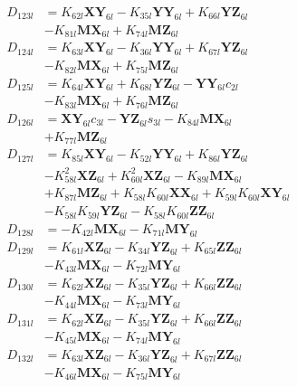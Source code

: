 \begin{align}
D_{123l} &= K_{62l}\mathbf{XY}_{6l} - K_{35l}\mathbf{YY}_{6l} + K_{66l}\mathbf{YZ}_{6l}  \nonumber \\
&- K_{81l}\mathbf{MX}_{6l} + K_{74l}\mathbf{MZ}_{6l} \nonumber \\
D_{124l} &= K_{63l}\mathbf{XY}_{6l} - K_{36l}\mathbf{YY}_{6l} + K_{67l}\mathbf{YZ}_{6l}  \nonumber \\
&- K_{82l}\mathbf{MX}_{6l} + K_{75l}\mathbf{MZ}_{6l} \nonumber \\
D_{125l} &= K_{64l}\mathbf{XY}_{6l} + K_{68l}\mathbf{YZ}_{6l} - \mathbf{YY}_{6l}c_{2l}  \nonumber \\
&- K_{83l}\mathbf{MX}_{6l} + K_{76l}\mathbf{MZ}_{6l} \nonumber \\
D_{126l} &= \mathbf{XY}_{6l}c_{3l} - \mathbf{YZ}_{6l}s_{3l} - K_{84l}\mathbf{MX}_{6l}  \nonumber \\
&+ K_{77l}\mathbf{MZ}_{6l} \nonumber \\
D_{127l} &= K_{85l}\mathbf{XY}_{6l} - K_{52l}\mathbf{YY}_{6l} + K_{86l}\mathbf{YZ}_{6l}  \nonumber \\
&- K_{58l}^2\mathbf{XZ}_{6l} + K_{60l}^2\mathbf{XZ}_{6l} - K_{89l}\mathbf{MX}_{6l}  \nonumber \\
&+ K_{87l}\mathbf{MZ}_{6l} + K_{58l}K_{60l}\mathbf{XX}_{6l} + K_{59l}K_{60l}\mathbf{XY}_{6l}  \nonumber \\
&- K_{58l}K_{59l}\mathbf{YZ}_{6l} - K_{58l}K_{60l}\mathbf{ZZ}_{6l} \nonumber \\
D_{128l} &= - K_{42l}\mathbf{MX}_{6l} - K_{71l}\mathbf{MY}_{6l} \nonumber \\
D_{129l} &= K_{61l}\mathbf{XZ}_{6l} - K_{34l}\mathbf{YZ}_{6l} + K_{65l}\mathbf{ZZ}_{6l}  \nonumber \\
&- K_{43l}\mathbf{MX}_{6l} - K_{72l}\mathbf{MY}_{6l} \nonumber \\
D_{130l} &= K_{62l}\mathbf{XZ}_{6l} - K_{35l}\mathbf{YZ}_{6l} + K_{66l}\mathbf{ZZ}_{6l}  \nonumber \\
&- K_{44l}\mathbf{MX}_{6l} - K_{73l}\mathbf{MY}_{6l} \nonumber \\
D_{131l} &= K_{62l}\mathbf{XZ}_{6l} - K_{35l}\mathbf{YZ}_{6l} + K_{66l}\mathbf{ZZ}_{6l}  \nonumber \\
&- K_{45l}\mathbf{MX}_{6l} - K_{74l}\mathbf{MY}_{6l} \nonumber \\
D_{132l} &= K_{63l}\mathbf{XZ}_{6l} - K_{36l}\mathbf{YZ}_{6l} + K_{67l}\mathbf{ZZ}_{6l}  \nonumber \\
&- K_{46l}\mathbf{MX}_{6l} - K_{75l}\mathbf{MY}_{6l} \nonumber \\

\end{align}

